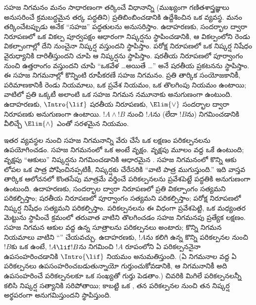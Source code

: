 \documentclass[../../../include/open-logic-section]{subfiles}
\begin{document}
      {}
      {}


సహజ నిగమనం మనం సాధారణంగా తర్కించే విధానాన్ని (ముఖ్యంగా గణితశాస్త్రజ్ఞులు
అనుసరించే క్రమబద్ధమైన తర్క పద్ధతిని) ప్రతిబింబించడానికి ఉద్దేశించిన
ఒక  వ్యవస్థ. మనం తర్కించేటప్పుడు అనేక “సహజ”
పద్ధతులను అనుసరిస్తాం. ఉదాహరణకు, సందర్భాల ద్వారా నిరూపణలో ఒక
వికల్ప పూర్వపక్షం ఆధారంగా నిష్కర్షను స్థాపించడానికి, ఆ వికల్పంలోని
రెండు వికల్పాంగాల్లో దేని నుంచైనా నిష్కర్ష వస్తుందని స్థాపిస్తాం.
పరోక్ష నిరూపణలో ఒక నిష్కర్ష నిషేధం వైరుధ్యానికి దారితీస్తుందని
చూపి ఆ నిష్కర్షను స్థాపిస్తాం. షరతీయ నిరూపణలో పూర్వాంగం నుంచి
ఉత్తరాంగం వస్తుందని చూపి “ఒకవేళ \dots అయితే \dots” అనే షరతీయ
ప్రకటనను స్థాపిస్తాం. ఈ సహజ నిగమనాల్లో కొన్నింటి రూపీకరణే సహజ
నిగమనం. ప్రతి తార్కిక సంయోజకానికీ, పరిమాణకానికీ రెండు నియమాలు,
ఒక ప్రవేశ నియమం, ఒక తొలగింపు నియమం ఉంటాయి; వాటిలో ప్రతి ఒక్కటీ
అలాంటి ఒక సహజ నిగమన నమూనాకు అనుగుణంగా ఉంటుంది. ఉదాహరణకు,
$\Intro{\lif}$ షరతీయ నిరూపణకు, $\Elim{\lor}$ సందర్భాల ద్వారా
నిరూపణకు అనుగుణంగా ఉంటాయి. $!A \land !B$ నుంచి $!A$ను (లేదా
$!B$ను) నిగమించడానికి వీలిచ్చే $\Elim{\land}$ ఎంతో సరళమైన నియమం.

ఇతర  వ్యవస్థల నుంచి సహజ నిగమనాన్ని వేరు చేసే ఒక
లక్షణం పరికల్పనలను ఉపయోగించడం. సహజ నిగమనంలో ఒక 
అంటే  వృక్షం.  వృక్షపు మూలం వద్ద ఒకే
 ఉంటుంది; వృక్షపు “ఆకులు” నిష్కర్షను నిగమించడానికి ఆధారమైన
. సహజ నిగమనంలో కొన్ని ఆకు 
 లోపల ఒక పాత్ర పోషించినప్పటికీ, 
నిష్కర్షకు చేరేసరికి “వాటి పాత్ర ముగుస్తుంది.” ఇది వాస్తవ తార్కిక
ఆలోచనలో కొంతసేపు మాత్రమే వర్తించే పరికల్పనలను ప్రవేశపెట్టే
పద్ధతికి అనుగుణంగా ఉంటుంది. ఉదాహరణకు, సందర్భాల ద్వారా నిరూపణలో ప్రతి
వికల్పాంగం సత్యమని పరికల్పిస్తాం; షరతీయ నిరూపణలో పూర్వాంగం
సత్యమని పరికల్పిస్తాం; పరోక్ష నిరూపణలో నిష్కర్ష నిషేధం సత్యమని
పరికల్పిస్తాం. పరికల్పనలను ఈ విధంగా ప్రవేశపెట్టి, ఒక
మధ్యంతర మెట్టును స్థాపించే క్రమంలో తరువాత వాటిని తొలగించడం సహజ
నిగమనపు ప్రత్యేక లక్షణం. సహజ నిగమన  ఆకుల వద్ద
ఉన్న సూత్రాలను పరికల్పనలు అంటారు; కొన్ని నిగమన నియమాలు వాటిని
“” చేయవచ్చు. ఉదాహరణకు, $!A$ను కలిగి ఉన్న కొన్ని
పరికల్పనల నుంచి $!B$కు ఒక  ఉంటే, $!A \lif !B$ను
నిగమించి $!A$ రూపంలోని ఏ పరికల్పననైనా ఉపసంహరించడానికి
$\Intro{\lif}$ నియమం అనుమతిస్తుంది. (ఏ నిగమనాల వద్ద ఏ పరికల్పనలు
ఉపసంహరించబడుతున్నాయో గుర్తుంచుకోవడానికి, ఆ నిగమనానికీ అది
ఉపసంహరించే పరికల్పనలకూ ఒక సంఖ్యతో గుర్తు పెడతాం.)
 చివరికి  మిగిలే పరికల్పనలన్నీ కలిసి
నిష్కర్ష సత్యానికి సరిపోతాయి; కాబట్టి ఒక , తన
 పరికల్పనల నుంచి తన నిష్కర్ష అర్థపరంగా అనుగమిస్తుందని స్థాపిస్తుంది.
\end{document}
